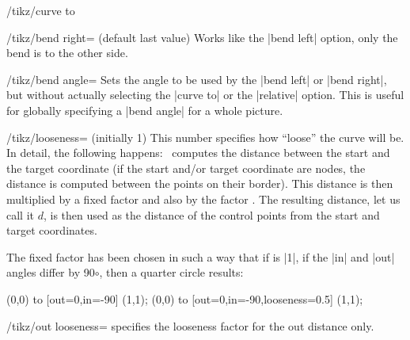 \begin{key}{/tikz/curve to}
  \begin{key}{/tikz/bend right= (default \normalfont last  value)}
    Works like the |bend left| option, only the bend is to the other side.
  \end{key}

  \begin{key}{/tikz/bend angle=}
    Sets the angle to be used by the |bend left| or |bend right|, but
    without actually selecting the |curve to| or the |relative|
    option. This is useful for globally specifying a |bend angle| for a
    whole picture.
  \end{key}

  \begin{key}{/tikz/looseness= (initially 1)}
    This number specifies how ``loose'' the curve will be. In detail,
    the following happens: \tikzname\ computes the distance between the
    start and the target coordinate (if the start and/or target
    coordinate are nodes, the distance is computed between the points on
    their border). This distance is then multiplied by a fixed factor
    and also by the factor . The resulting distance, let us
    call it $d$, is then used as the distance of the control points from
    the start and target coordinates.

    The fixed factor has been chosen in such a way that if 
    is |1|, if the |in| and |out| angles differ by
    90$\circ$, then a quarter circle results:
  \begin{codeexample}[]
\tikz \draw (0,0) to [out=0,in=-90]               (1,1);
\tikz \draw (0,0) to [out=0,in=-90,looseness=0.5] (1,1);
  \end{codeexample}
  \end{key}

  \begin{key}{/tikz/out looseness=}
    specifies the looseness factor for the out distance only.
  \end{key}


\end{key}
